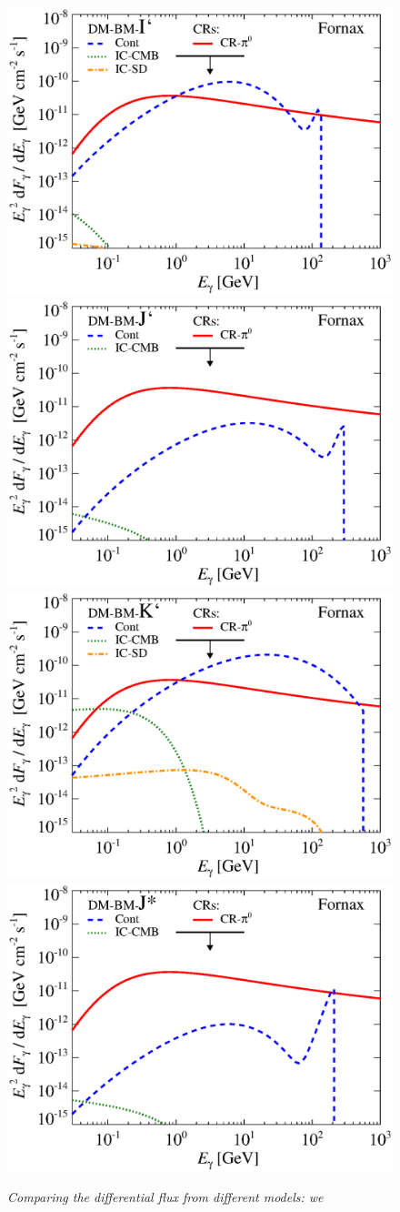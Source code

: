 \documentclass[10pt,aps,pra,reprint,amsmath,amsfonts,amssymb,showpacs,nofootinbib,floatfix]{revtex4-1}
\begin{document}
\begin{figure}
\begin{minipage}{2.0\columnwidth}
 \includegraphics[width=0.49\columnwidth]{figures/flux.BMcompI.v13.0.1deg.1.6T.SubMass.IR2.noMW.woGal.eps}
\includegraphics[width=0.49\columnwidth]{figures/flux.BMcompJ.v13.0.1deg.1.6T.SubMass.IR2.noMW.woGal.eps}
\includegraphics[width=0.49\columnwidth]{figures/flux.BMcompK.v13.0.1deg.1.6T.SubMass.IR2.noMW.woGal.eps}
\includegraphics[width=0.49\columnwidth]{figures/flux.BMcompJs.v13.0.1deg.1.6T.SubMass.IR2.noMW.woGal.eps}
\caption{\it Comparing the differential flux from different models: we
}
\end{minipage}
\end{figure}
\end{document}
